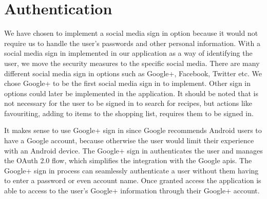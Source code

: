 \section{Authentication}
We have chosen to implement a social media sign in option because it would not require us to handle the user's passwords and other personal information. With a social media sign in implemented in our application as a way of identifying the user, we move the security measures to the specific social media.
There are many different social media sign in options such as Google+, Facebook, Twitter etc. We chose Google+ to be the first social media sign in to implement. Other sign in options could later be implemented in the application. It should be noted that is not necessary for the user to be signed in to search for recipes, but actions like favouriting, adding to items to the shopping list, requires them to be signed in.

It makes sense to use Google+ sign in since Google recommends Android users to have a Google account, because otherwise the user would limit their experience with an Android device. 
The Google+ sign in authenticates the user and manages the OAuth 2.0 flow, which simplifies the integration with the Google \ac{api}s.
The Google+ sign in process can seamlessly authenticate a user without them having to enter a password or even account name. 
Once granted access the application is able to access to the user's Google+ information through their Google+ account.\cite{googleplusvideo}

